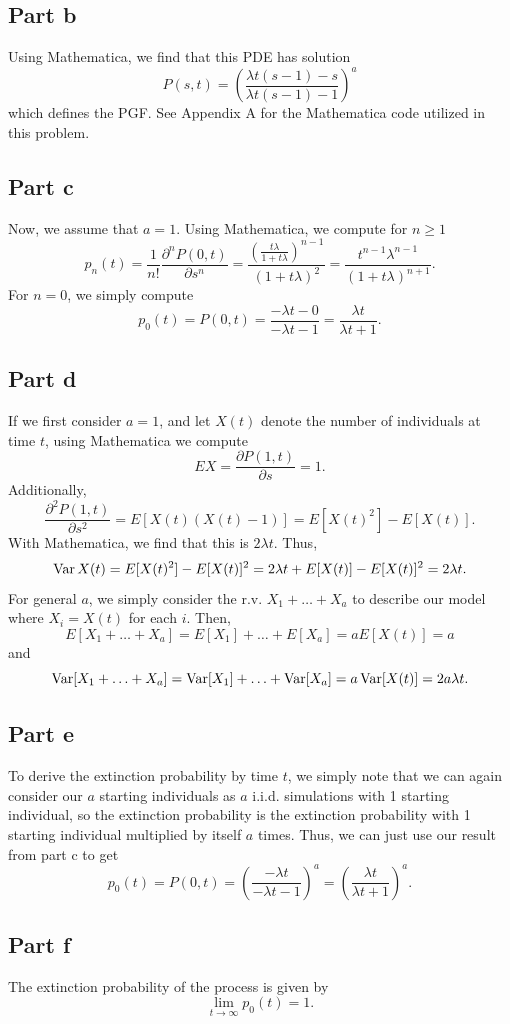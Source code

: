\documentclass{article}
\begin{document}
\subsection{Part b}
Using Mathematica, we find that this PDE has solution
\[
P(s,t)=\left(\frac{\lambda t(s-1)-s}{\lambda t(s-1)-1}\right)^a
\]
which defines the PGF. See Appendix A for the Mathematica code utilized in this problem. 

\subsection{Part c}
Now, we assume that $a=1$. Using Mathematica, we compute for $n\geq1$
\[
p_n(t)=\frac{1}{n!}\frac{\partial^n P(0,t)}{\partial s^n}=\frac{\left(\frac{t\lambda}{1+t\lambda}\right)^{n-1}}{(1+t\lambda)^2}=\frac{t^{n-1}\lambda^{n-1}}{(1+t\lambda)^{n+1}}.
\]
For $n=0$, we simply compute
\[
p_0(t)=P(0,t)=\frac{-\lambda t-0}{-\lambda t-1}=\frac{\lambda t}{\lambda t+1}.
\]

\subsection{Part d}
If we first consider $a=1$, and let $X(t)$ denote the number of individuals at time $t$, using Mathematica we compute 
\[
EX=\frac{\partial P(1,t)}{\partial s}=1.
\]
Additionally,
\[
\frac{\partial^2 P(1,t)}{\partial s^2}=E[X(t)(X(t)-1)]=E[X(t)^2]-E[X(t)].
\]
With Mathematica, we find that this is $2\lambda t$. Thus,
\[
\operatorname{Var} X(t)=E[X(t)^2]-E[X(t)]^2=2\lambda t+E[X(t)]-E[X(t)]^2=2\lambda t.
\]
For general $a$, we simply consider the r.v. $X_1+\ldots+X_a$ to describe our model where $X_i=X(t)$ for each $i$. Then,
\[
E[X_1+\ldots+X_a]=E[X_1]+\ldots+E[X_a]=aE[X(t)]=a
\]
and 
\[
\operatorname{Var}[X_1+\ldots+X_a]=\operatorname{Var}[X_1]+\ldots+\operatorname{Var}[X_a]=a\operatorname{Var}[X(t)]=2a\lambda t.
\]

\subsection{Part e}
To derive the extinction probability by time $t$, we simply note that we can again consider our $a$ starting individuals as $a$ i.i.d. simulations with 1 starting individual, so the extinction probability is the extinction probability with 1 starting individual multiplied by itself $a$ times. Thus, we can just use our result from part c to get
\[
p_0(t)=P(0,t)=\left(\frac{-\lambda t}{-\lambda t-1}\right)^a=\left(\frac{\lambda t}{\lambda t+1}\right)^a.
\]

\subsection{Part f}
The extinction probability of the process is given by
\[
\lim_{t\to\infty}p_0(t)=1.
\]
\end{document}
